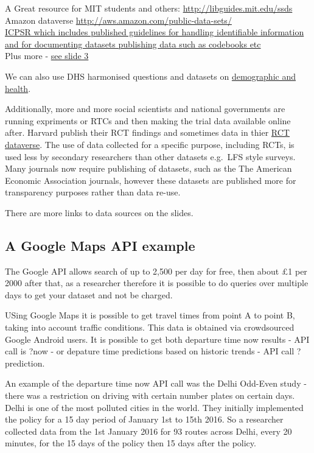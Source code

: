 \documentclass[]{book}
\theoremstyle{definition}
\theoremstyle{definition}
\theoremstyle{definition}
\theoremstyle{remark}
\begin{document}
A Great resource for MIT students and others:
\url{http://libguides.mit.edu/ssds}\\
Amazon dataverse \url{http://aws.amazon.com/public-data-sets/}\\
\href{http://www.icpsr.umich.edu/icpsrweb/ICPSR/}{ICPSR which includes
published guidelines for handling identifiable information and for
documenting datasets publishing data such as codebooks etc}\\
Plus more - \href{./files/M1/Gathering_Data.pdf}{see slide 3}

We can also use DHS harmonised questions and datasets on
\href{http://www.dhsprogram.com/}{demographic and health}.

Additionally, more and more social scientists and national governments
are running expriments or RTCs and then making the trial data available
online after. Harvard publish their RCT findings and sometimes data in
thier
\href{https://dataverse.harvard.edu/dataverse/socialsciencercts}{RCT
dataverse}. The use of data collected for a specific purpose, including
RCTs, is used less by secondary researchers than other datasets e.g.~LFS
style surveys. Many journals now require publishing of datasets, such as
the The American Economic Association journals, however these datasets
are published more for transparency purposes rather than data re-use.

There are more links to data sources on the slides.

\subsection{A Google Maps API example}\label{a-google-maps-api-example}

The Google API allows search of up to 2,500 per day for free, then about
£1 per 2000 after that, as a researcher therefore it is possible to do
queries over multiple days to get your dataset and not be charged.

USing Google Maps it is possible to get travel times from point A to
point B, taking into account traffic conditions. This data is obtained
via crowdsourced Google Android users. It is possible to get both
departure time now results - API call is ?now - or depature time
predictions based on historic trends - API call ?prediction.

An example of the departure time now API call was the Delhi Odd-Even
study - there was a restriction on driving with certain number plates on
certain days. Delhi is one of the most polluted cities in the world.
They initially implemented the policy for a 15 day period of January 1st
to 15th 2016. So a researcher collected data from the 1st January 2016
for 93 routes across Delhi, every 20 minutes, for the 15 days of the
policy then 15 days after the policy.
\end{document}
